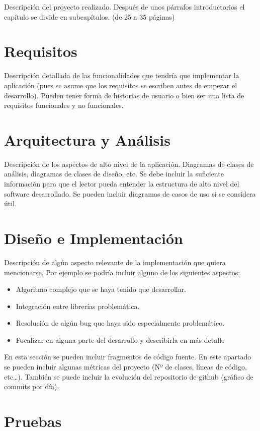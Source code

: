Descripción del proyecto realizado. Después de unos párrafos introductorios el capítulo se divide en subcapítulos. (de 25 a 35 páginas)

\section{Requisitos}

Descripción detallada de las funcionalidades que tendría que implementar la aplicación (pues se asume que los requisitos se escriben antes de empezar el desarrollo). Pueden tener forma de historias de usuario o bien ser una lista de requisitos funcionales y no funcionales.

\section{Arquitectura y Análisis}

Descripción de los aspectos de alto nivel de la aplicación. Diagramas de clases de análisis, diagramas de clases de diseño, etc. Se debe incluir la suficiente información para que el lector pueda entender la estructura de alto nivel del software desarrollado. Se pueden incluir diagramas de casos de uso si se considera útil.

\section{Diseño e Implementación} 

Descripción de algún aspecto relevante de la implementación que quiera mencionarse. Por ejemplo se podría incluir alguno de los siguientes aspectos:
\begin{itemize}
    \item Algoritmo complejo que se haya tenido que desarrollar.
    \item Integración entre librerías problemática.
    \item Resolución de algún bug que haya sido especialmente problemático.
    \item Focalizar en alguna parte del desarrollo y describirla en más detalle
\end{itemize}

En esta sección se pueden incluir fragmentos de código fuente. En este apartado se pueden incluir algunas métricas del proyecto (Nº de clases, líneas de código, etc…). También se puede incluir la evolución del repositorio de github (gráfico de commits por día).

\section{Pruebas} 

